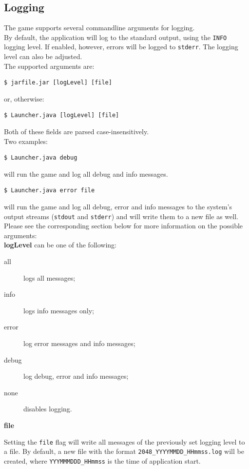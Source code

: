 \documentclass[a4paper,11pt,report]{scrartcl}
\begin{document}
\subsection{Logging}
The game supports several commandline arguments for logging.\\

By default, the application will log to the standard output, using the
\texttt{INFO} logging level. If enabled, however, errors will be logged to
\texttt{stderr}. The logging level can also be adjusted.\\

The supported arguments are:
\begin{verbatim}
$ jarfile.jar [logLevel] [file]
\end{verbatim}
or, otherwise:
\begin{verbatim}
$ Launcher.java [logLevel] [file]
\end{verbatim}
Both of these fields are parsed case-insensitively.\\

Two examples:
\begin{verbatim}
$ Launcher.java debug
\end{verbatim}
will run the game and log all debug and info messages. 
\begin{verbatim}
$ Launcher.java error file
\end{verbatim}
will run the game and log all debug, error and info messages to the system's
output streams (\texttt{stdout} and \texttt{stderr}) and will write them to a
new file as well.\\

Please see the corresponding section below for more information on the possible
arguments:\\

\textbf{logLevel} can be one of the following:
\begin{description}
	\item[all] logs all messages;
	\item[info] logs info messages only;
	\item[error] log error messages and info messages;
	\item[debug] log debug, error and info messages;
	\item[none] disables logging.
\end{description}

\textbf{file}

Setting the \texttt{file} flag will write all messages of the previously set
logging level to a file. By default, a new file with the format
\texttt{2048\_YYYYMMDD\_HHmmss.log} will be created, where
\texttt{YYYMMMDDD\_HHmmss} is the time of application start.
\end{document}
